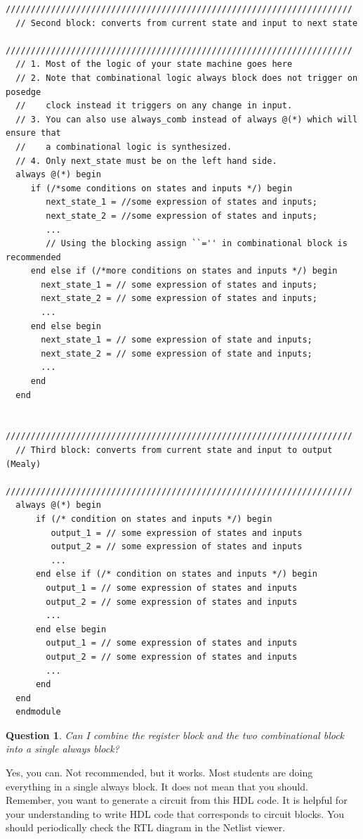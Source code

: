 \documentclass{article}
\newtheorem{question}{Question}
\begin{document}
\begin{lstlisting}[style=verilog-style,frame=ltrb]
  /////////////////////////////////////////////////////////////////////
  // Second block: converts from current state and input to next state
  /////////////////////////////////////////////////////////////////////
  // 1. Most of the logic of your state machine goes here
  // 2. Note that combinational logic always block does not trigger on posedge
  //    clock instead it triggers on any change in input.
  // 3. You can also use always_comb instead of always @(*) which will ensure that
  //    a combinational logic is synthesized.
  // 4. Only next_state must be on the left hand side.
  always @(*) begin
     if (/*some conditions on states and inputs */) begin
        next_state_1 = //some expression of states and inputs;
        next_state_2 = //some expression of states and inputs;
        ...
        // Using the blocking assign ``='' in combinational block is recommended
     end else if (/*more conditions on states and inputs */) begin
       next_state_1 = // some expression of states and inputs;
       next_state_2 = // some expression of states and inputs;
       ...
     end else begin
       next_state_1 = // some expression of state and inputs;
       next_state_2 = // some expression of state and inputs;
       ...
     end
  end

  /////////////////////////////////////////////////////////////////////
  // Third block: converts from current state and input to output (Mealy)
  /////////////////////////////////////////////////////////////////////
  always @(*) begin
      if (/* condition on states and inputs */) begin
         output_1 = // some expression of states and inputs
         output_2 = // some expression of states and inputs
         ...
      end else if (/* condition on states and inputs */) begin
        output_1 = // some expression of states and inputs
        output_2 = // some expression of states and inputs
        ...
      end else begin
        output_1 = // some expression of states and inputs
        output_2 = // some expression of states and inputs
        ...
      end 
  end
  endmodule
\end{lstlisting}

\begin{question}
  Can I combine the register block and the two combinational block into a single
  always block?
\end{question}
Yes, you can. Not recommended, but it works. Most students are doing everything in a single always
block. It does not mean that you should. Remember, you want to generate a
circuit from this HDL code. It is helpful for your understanding to write HDL
code that corresponds to circuit blocks. You should periodically check the RTL
diagram in the Netlist viewer.
\end{document}
